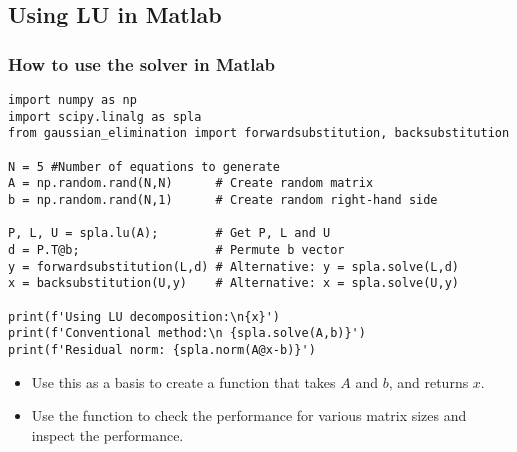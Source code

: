 
\subsection*{Using LU in Matlab}
\begin{frame}[fragile]
  \frametitle{How to use the solver in Matlab}
  \begin{lstlisting}
import numpy as np
import scipy.linalg as spla
from gaussian_elimination import forwardsubstitution, backsubstitution

N = 5 #Number of equations to generate
A = np.random.rand(N,N)      # Create random matrix
b = np.random.rand(N,1)      # Create random right-hand side

P, L, U = spla.lu(A);        # Get P, L and U
d = P.T@b;                   # Permute b vector 
y = forwardsubstitution(L,d) # Alternative: y = spla.solve(L,d)
x = backsubstitution(U,y)    # Alternative: x = spla.solve(U,y)

print(f'Using LU decomposition:\n{x}')
print(f'Conventional method:\n {spla.solve(A,b)}')
print(f'Residual norm: {spla.norm(A@x-b)}')
  \end{lstlisting}
  \pause
  \begin{itemize}
     \item Use this as a basis to create a function that takes $A$ and $b$, and returns $x$.
     \item Use the function to check the performance for various matrix sizes and inspect the performance.
  \end{itemize}

\end{frame}
